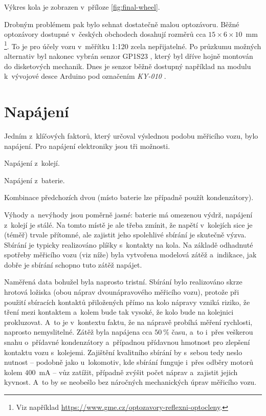 Výkres kola je zobrazen v~příloze \ref{fig:final-wheel}.

Drobným problémem pak bylo sehnat dostatečně malou optozávoru. Běžné optozávory
dostupné v~českých obchodech dosahují rozměrů cca $15\times6\times10$~mm
\footnote{Viz například
\url{https://www.gme.cz/optozavory-reflexni-optocleny}.}. To je pro účely vozu
v~měřítku 1:120 zcela nepřijatelné. Po
průzkumu možných alternativ byl nakonec vybrán senzor
GP1S23 \cite{gp1s23:datasheet}, který byl dříve hojně montován do disketových
mechanik. Dnes je senzor běžně dostupný například na modulu k~vývojové desce
Arduino pod označením \textit{KY-010} \cite{ky-010}.

\section{Napájení}
\label{sec:wsm-napajeni}

Jedním z~klíčových faktorů, který určoval výslednou podobu měřicího vozu, bylo
napájení. Pro napájení elektroniky jsou tři možnosti.

\begin{compactenum}
\item Napájení z~kolejí.
\item Napájení z~baterie.
\item Kombinace předchozích dvou (místo baterie lze případně použít kondenzátory).
\end{compactenum}

Výhody a~nevýhody jsou poměrně jasné: baterie má omezenou výdrž, napájení
z~kolejí je stálé. Na tomto místě je ale třeba zmínit, že napětí v~kolejích
sice je (téměř) trvale přítomné, ale zajistit jeho spolehlivé sbírání je
skutečně výzva. Sbírání je typicky realizováno plíšky s~kontakty na kola.
Na základě odhadnuté spotřeby měřicího vozu (viz níže) byla vytvořena modelová
zátěž a~indikace, jak dobře je sbírání schopno tuto zátěž napájet.

Naměřená data bohužel byla naprosto tristní. Sbírání bylo realizováno skrze
hrotová ložiska (obou náprav dvounápravového měřicího vozu), protože při použití
sbíracích kontaktů přiložených přímo na kolo nápravy vzniká riziko, že tření mezi
kontaktem a~kolem bude tak vysoké, že kolo bude na kolejnici prokluzovat. A~to
je v~kontextu faktu, že na nápravě probíhá měření rychlosti, naprosto
nemyslitelné. Zátěž byla napájena cca $50~\%$ času, a~to i~přes veškerou snahu
o~přídavné kondenzátory a~případnou přídavnou hmotnost pro zlepšení kontaktu
vozu s~kolejemi. Zajištění kvalitního sbírání by s~sebou tedy neslo nutnost --
podobně jako u~lokomotiv, kde sbírání funguje i~přes odběry motorů kolem
$400$~mA -- vůz zatížit, případně zvýšit počet náprav a~zajistit jejich
kyvnost. A~to by se neobešlo bez náročných mechanických úprav měřicího vozu.

